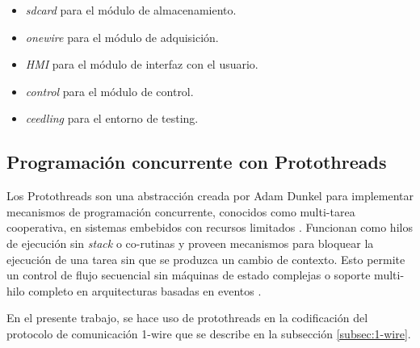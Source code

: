 \begin{itemize}
	\item \textit{sdcard} para el módulo de almacenamiento.
	\item \textit{onewire} para el módulo de adquisición.
	\item \textit{HMI} para el módulo de interfaz con el usuario.
	\item \textit{control} para el módulo de control.
	\item \textit{ceedling} para el entorno de testing.
\end{itemize}  



\subsection{Programación concurrente con Protothreads} 
\label{subsec:protothreads}

Los Protothreads son una abstracción creada por Adam Dunkel para implementar mecanismos de programación concurrente, conocidos como multi-tarea cooperativa, en sistemas embebidos con recursos limitados \citep{Protothreads}. Funcionan como hilos de ejecución sin \textit{stack} o co-rutinas y proveen mecanismos para bloquear la ejecución de una tarea sin que se produzca un cambio de contexto.  Esto permite un control de flujo secuencial sin máquinas de estado complejas o soporte multi-hilo completo en arquitecturas basadas en eventos \citep{dunkels06protothreads} \citep{dunkels05using}. 

En el presente trabajo, se hace uso de protothreads en la codificación del protocolo de comunicación 1-wire que se describe en la subsección \ref{subsec:1-wire}.